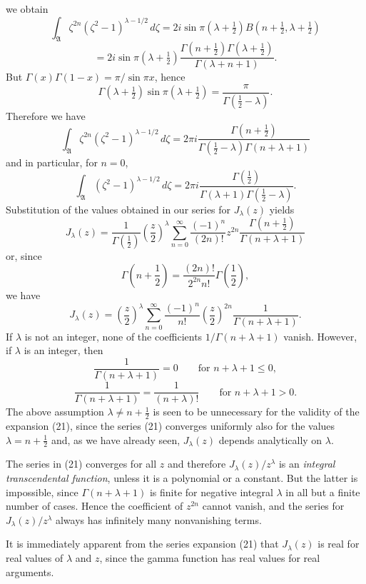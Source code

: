 we obtain
\[
\int_{\mathfrak A}\zeta^{2n}(\zeta^2-1)^{\lambda-1/2}\,d\zeta
=2i\sin\pi\left(\lambda+\tfrac12\right)
B\left(n+\tfrac12,\lambda+\tfrac12\right)
\]
\[
=2i\sin\pi\left(\lambda+\tfrac12\right)
\frac{\Gamma(n+\tfrac12)\Gamma(\lambda+\tfrac12)}{\Gamma(\lambda+n+1)}.
\]
But $\Gamma(x)\Gamma(1-x)=\pi/\sin\pi x$, hence
\[
\Gamma\left(\lambda+\tfrac12\right)\sin\pi\left(\lambda+\tfrac12\right)
=\frac\pi{\Gamma(\tfrac12-\lambda)}.
\]
Therefore we have
\[
\int_{\mathfrak A}\zeta^{2n}(\zeta^2-1)^{\lambda-1/2}\,d\zeta
=2\pi i\frac{\Gamma(n+\tfrac12)}{\Gamma(\tfrac12-\lambda)\Gamma(n+\lambda+1)}
\]
and in particular, for $n=0$,
\[
\int_{\mathfrak A}(\zeta^2-1)^{\lambda-1/2}\,d\zeta
=2\pi i\frac{\Gamma(\tfrac12)}{\Gamma(\lambda+1)\Gamma(\tfrac12-\lambda)}.
\]
Substitution of the values obtained in our series for $J_\lambda(z)$ yields
\[
J_\lambda(z)=\frac1{\Gamma(\tfrac12)}\left(\frac z2\right)^\lambda
\sum_{n=0}^{\infty}\frac{(-1)^n}{(2n)!}z^{2n}
\frac{\Gamma(n+\tfrac12)}{\Gamma(n+\lambda+1)}
\]
or, since
\[
\Gamma\left(n+\frac12\right)=\frac{(2n)!}{2^{2n}n!}\Gamma\left(\frac12\right),
\]
we have
\begin{equation}\tag{21}
J_\lambda(z)=\left(\frac z2\right)^\lambda
\sum_{n=0}^{\infty}\frac{(-1)^n}{n!}\left(\frac z2\right)^{2n}
\frac1{\Gamma(n+\lambda+1)}.
\end{equation}
If $\lambda$ is not an integer, none of the coefficients $1/\Gamma(n+\lambda+1)$ vanish. However, if $\lambda$ is an integer, then
\[
\frac1{\Gamma(n+\lambda+1)}=0\qquad\text{for }n+\lambda+1\le0,
\]
\[
\frac1{\Gamma(n+\lambda+1)}=\frac1{(n+\lambda)!}\qquad\text{for }n+\lambda+1>0.
\]
The above assumption $\lambda\ne n+\tfrac12$ is seen to be unnecessary for the validity of the expansion (21), since the series (21) converges uniformly also for the values $\lambda=n+\tfrac12$ and, as we have already seen, $J_\lambda(z)$ depends analytically on $\lambda$.

The series in (21) converges for all $z$ and therefore $J_\lambda(z)/z^\lambda$ is an \emph{integral transcendental function}, unless it is a polynomial or a constant. But the latter is impossible, since $\Gamma(n+\lambda+1)$ is finite for negative integral $\lambda$ in all but a finite number of cases. Hence the coefficient of $z^{2n}$ cannot vanish, and the series for $J_\lambda(z)/z^\lambda$ always has infinitely many nonvanishing terms.

It is immediately apparent from the series expansion (21) that $J_\lambda(z)$ is real for real values of $\lambda$ and $z$, since the gamma function has real values for real arguments.

